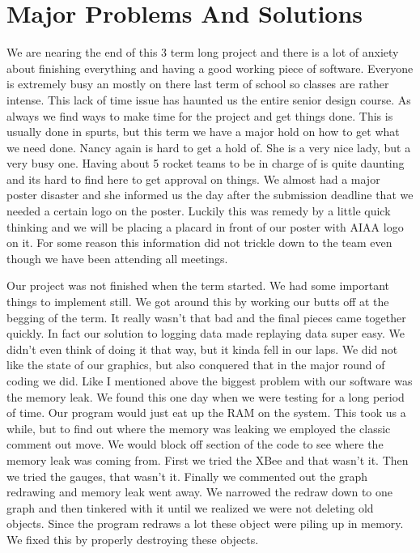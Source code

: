 \documentclass[10pt,draftclsnofoot,onecolumn]{IEEEtran}
\begin{document}
\section{Major Problems And Solutions}
We are nearing the end of this 3 term long project and there is a lot of anxiety about finishing everything and having a good working piece of software. Everyone is extremely busy an mostly on there last term of school so classes are rather intense. This lack of time issue has haunted us the entire senior design course. As always we find ways to make time for the project and get things done. This is usually done in spurts, but this term we have a major hold on how to get what we need done. Nancy again is hard to get a hold of. She is a very nice lady, but a very busy one. Having about 5 rocket teams to be in charge of is quite daunting and its hard to find here to get approval on things. We almost had a major poster disaster and she informed us the day after the submission deadline that we needed a certain logo on the poster. Luckily this was remedy by a little quick thinking and we will be placing a placard in front of our poster with AIAA logo on it. For some reason this information did not trickle down to the team even though we have been attending all meetings. \par

Our project was not finished when the term started. We had some important things to implement still. We got around this by working our butts off at the begging of the term. It really wasn't that bad and the final pieces came together quickly. In fact our solution to logging data made replaying data super easy. We didn't even think of doing it that way, but it kinda fell in our laps. We did not like the state of our graphics, but also conquered that in the major round of coding we did. Like I mentioned above the biggest problem with our software was the memory leak. We found this one day when we were testing for a long period of time. Our program would just eat up the RAM on the system. This took us a while, but to find out where the memory was leaking we employed the classic comment out move. We would block off section of the code to see where the memory leak was coming from. First we tried the XBee and that wasn't it. Then we tried the gauges, that wasn't it. Finally we commented out the graph redrawing and memory leak went away. We narrowed the redraw down to one graph and then tinkered with it until we realized we were not deleting old objects. Since the program redraws a lot these object were piling up in memory. We fixed this by properly destroying these objects.\par
\end{document}
